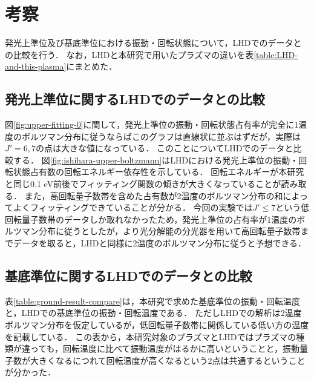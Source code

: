 \chapter{考察}
発光上準位及び基底準位における振動・回転状態について，LHDでのデータとの比較を行う．
なお，LHDと本研究で用いたプラズマの違いを表\ref{table:LHD-and-this-plasma}にまとめた．

\section{発光上準位に関するLHDでのデータとの比較}
図\ref{fig:upper-fitting-0}に関して，発光上準位の振動・回転状態占有率が完全に1温度のボルツマン分布に従うならばこのグラフは直線状に並ぶはずだが，実際は$J'=6,7$の点は大きな値になっている．
このことについてLHDでのデータと比較する．
図\ref{fig:ishihara-upper-boltzmann}はLHDにおける発光上準位の振動・回転状態占有数の回転エネルギー依存性を示している．
回転エネルギーが本研究と同じ0.1 eV前後でフィッティング関数の傾きが大きくなっていることが読み取る．
また，高回転量子数帯を含めた占有数が2温度のボルツマン分布の和によってよくフィッティングできていることが分かる．
今回の実験では$J' \leq 7$という低回転量子数帯のデータしか取れなかったため，発光上準位の占有率が1温度のボルツマン分布に従うとしたが，より光分解能の分光器を用いて高回転量子数帯までデータを取ると，LHDと同様に2温度のボルツマン分布に従うと予想できる．

\section{基底準位に関するLHDでのデータとの比較}
表\ref{table:ground-result-compare}は，本研究で求めた基底準位の振動・回転温度と，LHDでの基底準位の振動・回転温度である．
ただしLHDでの解析は2温度ボルツマン分布を仮定しているが，低回転量子数帯に関係している低い方の温度を記載している．
この表から，本研究対象のプラズマとLHDではプラズマの種類が違っても，回転温度に比べて振動温度がはるかに高いということと，振動量子数が大きくなるにつれて回転温度が高くなるという2点は共通するということが分かった．

\begin{comment}
図\ref{fig:upper-fitting-0}に関して，発光上準位の振動・回転状態占有率が完全にボルツマン分布に従うとするとこのグラフは直線になるはずだが，実際は$v'=0$の$J'=6,7$の点は大きな値になっている．
このことから，回転温度は視線方向に一定ではないことが考えられる．
高回転量子数域を含めた発光上準位の占有数のボルツマンプロットが直線から外れることは，他のプラズマでも報告されている．
図\ref{fig:ishihara-upper-boltzmann}は，岐阜県土岐市の核融合科学研究所にある大型ヘリカル装置(LHD)でのプラズマにおける，発光上準位における占有数のボルツマンプロットである\cite{ishihara}．
図中の点線は高低2温度のボルツマン分布を仮定したフィッティング結果であり，良く近似できていることが分かる．
また，発光上準位の占有数分布が2温度のボルツマン分布で良く近似できることは，放電の種類に関わらず複数計測されている\cite{ishihara, two-temperature-1, two-temperature-2}．
本研究の対称としたプラズマでも，より光分解能の分光器を用いて高回転量子数域までデータを取り，2温度のボルツマン分布を仮定することで，正確な占有率を計算することができると考えられる．
\end{comment}
